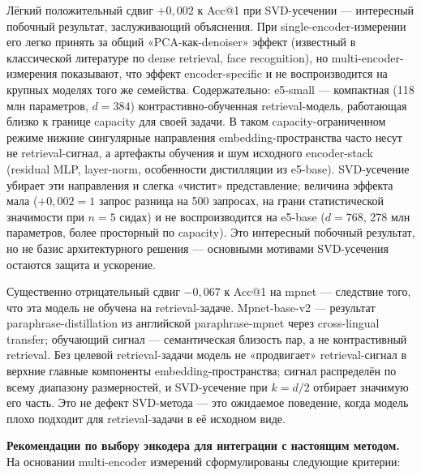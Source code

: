 \documentclass[a4paper, 12pt, oneside, openany]{article}
\begin{document}
Лёгкий положительный сдвиг $+0{,}002$ к Acc@1 при SVD-усечении --- интересный побочный результат, заслуживающий объяснения. При single-encoder-измерении его легко принять за общий «PCA-как-denoiser» эффект (известный в классической литературе по dense retrieval, face recognition), но multi-encoder-измерения показывают, что эффект encoder-specific и не воспроизводится на крупных моделях того же семейства. Содержательно: e5-small --- компактная (118 млн параметров, $d = 384$) контрастивно-обученная retrieval-модель, работающая близко к границе capacity для своей задачи. В таком capacity-ограниченном режиме нижние сингулярные направления embedding-пространства часто несут не retrieval-сигнал, а артефакты обучения и шум исходного encoder-stack (residual MLP, layer-norm, особенности дистилляции из e5-base). SVD-усечение убирает эти направления и слегка «чистит» представление; величина эффекта мала ($+0{,}002 = 1$ запрос разница на 500 запросах, на грани статистической значимости при $n = 5$ сидах) и не воспроизводится на e5-base ($d = 768$, 278 млн параметров, более просторный по capacity). Это интересный побочный результат, но не базис архитектурного решения --- основными мотивами SVD-усечения остаются защита и ускорение.

Существенно отрицательный сдвиг $-0{,}067$ к Acc@1 на mpnet --- следствие того, что эта модель не обучена на retrieval-задаче. Mpnet-base-v2 --- результат paraphrase-distillation из английской paraphrase-mpnet через cross-lingual transfer; обучающий сигнал --- семантическая близость пар, а не контрастивный retrieval. Без целевой retrieval-задачи модель не «продвигает» retrieval-сигнал в верхние главные компоненты embedding-пространства; сигнал распределён по всему диапазону размерностей, и SVD-усечение при $k = d/2$ отбирает значимую его часть. Это не дефект SVD-метода --- это ожидаемое поведение, когда модель плохо подходит для retrieval-задачи в её исходном виде.

\textbf{Рекомендации по выбору энкодера для интеграции с настоящим методом.} На основании multi-encoder измерений сформулированы следующие критерии:
\end{document}
